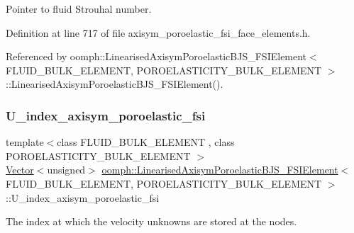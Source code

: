 Pointer to fluid Strouhal number. 



Definition at line 717 of file axisym\+\_\+poroelastic\+\_\+fsi\+\_\+face\+\_\+elements.\+h.



Referenced by oomph\+::\+Linearised\+Axisym\+Poroelastic\+B\+J\+S\+\_\+\+F\+S\+I\+Element$<$ F\+L\+U\+I\+D\+\_\+\+B\+U\+L\+K\+\_\+\+E\+L\+E\+M\+E\+N\+T, P\+O\+R\+O\+E\+L\+A\+S\+T\+I\+C\+I\+T\+Y\+\_\+\+B\+U\+L\+K\+\_\+\+E\+L\+E\+M\+E\+N\+T $>$\+::\+Linearised\+Axisym\+Poroelastic\+B\+J\+S\+\_\+\+F\+S\+I\+Element().

\mbox{\label{classoomph_1_1LinearisedAxisymPoroelasticBJS__FSIElement_a98bb2834379b10c46d90d66537cee1d7}} 
\subsubsection{\texorpdfstring{U\+\_\+index\+\_\+axisym\+\_\+poroelastic\+\_\+fsi}{U\_index\_axisym\_poroelastic\_fsi}}
{\footnotesize\ttfamily template$<$class F\+L\+U\+I\+D\+\_\+\+B\+U\+L\+K\+\_\+\+E\+L\+E\+M\+E\+NT , class P\+O\+R\+O\+E\+L\+A\+S\+T\+I\+C\+I\+T\+Y\+\_\+\+B\+U\+L\+K\+\_\+\+E\+L\+E\+M\+E\+NT $>$ \\
\hyperlink{classoomph_1_1Vector}{Vector}$<$unsigned$>$ \hyperlink{classoomph_1_1LinearisedAxisymPoroelasticBJS__FSIElement}{oomph\+::\+Linearised\+Axisym\+Poroelastic\+B\+J\+S\+\_\+\+F\+S\+I\+Element}$<$ F\+L\+U\+I\+D\+\_\+\+B\+U\+L\+K\+\_\+\+E\+L\+E\+M\+E\+NT, P\+O\+R\+O\+E\+L\+A\+S\+T\+I\+C\+I\+T\+Y\+\_\+\+B\+U\+L\+K\+\_\+\+E\+L\+E\+M\+E\+NT $>$\+::U\+\_\+index\+\_\+axisym\+\_\+poroelastic\+\_\+fsi\hspace{0.3cm}{\ttfamily [private]}}



The index at which the velocity unknowns are stored at the nodes. 



